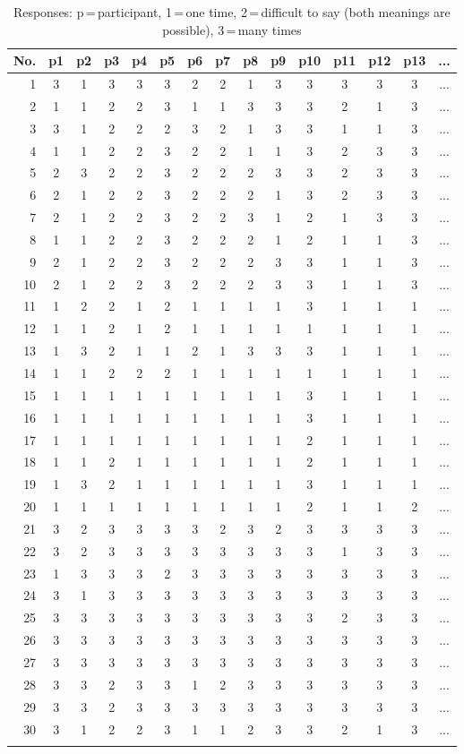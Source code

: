 \documentclass[output=paper]{langscibook}
\begin{document}
\begin{table}[p]\small
\begin{tabular}{r ccccccccccccc c}
   \lsptoprule
No. &p1&p2&p3&p4&p5&p6&p7&p8&p9&p10&p11&p12&p13 & ...\\\midrule
1   &3&1&3&3&3&2&2&1&3&3&3&3&3 & ...\\
2   &1&1&2&2&3&1&1&3&3&3&2&1&3 & ...\\
3   &3&1&2&2&2&3&2&1&3&3&1&1&3 & ...\\
4   &1&1&2&2&3&2&2&1&1&3&2&3&3 & ...\\
5   &2&3&2&2&3&2&2&2&3&3&2&3&3 & ...\\
6   &2&1&2&2&3&2&2&2&1&3&2&3&3 & ...\\
7   &2&1&2&2&3&2&2&3&1&2&1&3&3 & ...\\
8   &1&1&2&2&3&2&2&2&1&2&1&1&3 & ...\\
9   &2&1&2&2&3&2&2&2&3&3&1&1&3 & ...\\
10  &2&1&2&2&3&2&2&2&3&3&1&1&3 & ...\\
11  &1&2&2&1&2&1&1&1&1&3&1&1&1 & ...\\
12  &1&1&2&1&2&1&1&1&1&1&1&1&1 & ...\\
13  &1&3&2&1&1&2&1&3&3&3&1&1&1 & ...\\
14  &1&1&2&2&2&1&1&1&1&1&1&1&1 & ...\\
15  &1&1&1&1&1&1&1&1&1&3&1&1&1 & ...\\
16  &1&1&1&1&1&1&1&1&1&3&1&1&1 & ...\\
17  &1&1&1&1&1&1&1&1&1&2&1&1&1 & ...\\
18  &1&1&2&1&1&1&1&1&1&2&1&1&1 & ...\\
19  &1&3&2&1&1&1&1&1&1&3&1&1&1 & ...\\
20  &1&1&1&1&1&1&1&1&1&2&1&1&2 & ...\\
21  &3&2&3&3&3&3&2&3&2&3&3&3&3 & ...\\
22  &3&2&3&3&3&3&3&3&3&3&1&3&3 & ...\\
23  &1&3&3&3&2&3&3&3&3&3&3&3&3 & ...\\
24  &3&1&3&3&3&3&3&3&3&3&3&3&3 & ...\\
25  &3&3&3&3&3&3&3&3&3&3&2&3&3 & ...\\
26  &3&3&3&3&3&3&3&3&3&3&3&3&3 & ...\\
27  &3&3&3&3&3&3&3&3&3&3&3&3&3 & ...\\
28  &3&3&2&3&3&1&2&3&3&3&3&3&3 & ...\\
29  &3&3&2&3&3&3&3&3&3&3&3&3&3 & ...\\
30  &3&1&2&2&3&1&1&2&3&3&2&1&3 & ...\\
  \lspbottomrule
\end{tabular}
\caption{Responses: p\,=\,participant, 1\,=\,one time, 2\,=\,difficult to say (both meanings are possible), 3\,=\,many times}
\end{table}
\end{document}
